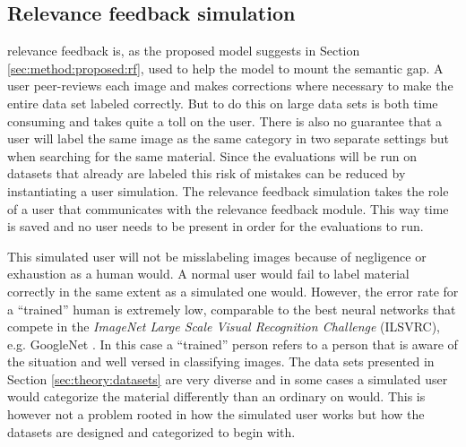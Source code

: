 \subsection{Relevance feedback simulation}
\label{sec:method:rf_simulation}
 relevance feedback is, as the proposed model suggests in Section \ref{sec:method:proposed:rf}, used to help the model to mount the semantic gap. A user peer-reviews each image and makes corrections where necessary to make the entire data set labeled correctly. But to do this on large data sets is both time consuming and takes quite a toll on the user. There is also no guarantee that a user will label the same image as the same category in two separate settings but when searching for the same material. 
Since the evaluations will be run on datasets that already are labeled this risk of mistakes can be reduced by instantiating a user simulation. The relevance feedback simulation takes the role of a user that communicates with the relevance feedback module. This way time is saved and no user needs to be present in order for the evaluations to run.  

This simulated user will not be misslabeling images because of negligence or exhaustion as a human would. 
A normal user would fail to label material correctly in the same extent as a simulated one would. 
However, the error rate for a ``trained'' human is extremely low, comparable to the best neural networks that compete in the \emph{ImageNet Large Scale Visual Recognition Challenge} (ILSVRC), e.g. GoogleNet \cite{ImageNetChallenge}. 
In this case a ``trained'' person refers to a person that is aware of the situation and well versed in classifying images. 
The data sets presented in Section \ref{sec:theory:datasets} are very diverse and in some cases a simulated user would categorize the material differently than an ordinary on would. This is however not a problem rooted in how the simulated user works but how the datasets are designed and categorized to begin with.
